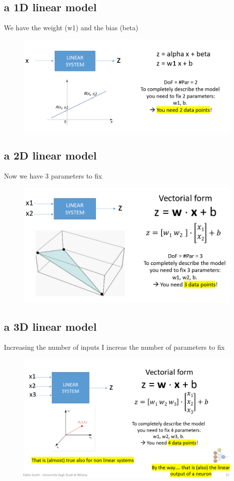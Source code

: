 \subsection{a 1D linear model}
\noindent We have the weight (w1) and the bias (beta)
\begin{figure}[H]
    \centering
    \includegraphics[width=0.8\linewidth]{07-08/images/d1.png}
\end{figure}

\newpage
\subsection{a 2D linear model}
Now we have 3 parameters to fix
\begin{figure}[H]
    \centering
    \includegraphics[width=0.8\linewidth]{07-08/images/2d.png}
\end{figure}

\subsection{a 3D linear model}
Increasing the number of inputs I increas the number of parameters to fix
\begin{figure}[H]
    \centering
    \includegraphics[width=0.8\linewidth]{07-08/images/3d.png}
\end{figure}

